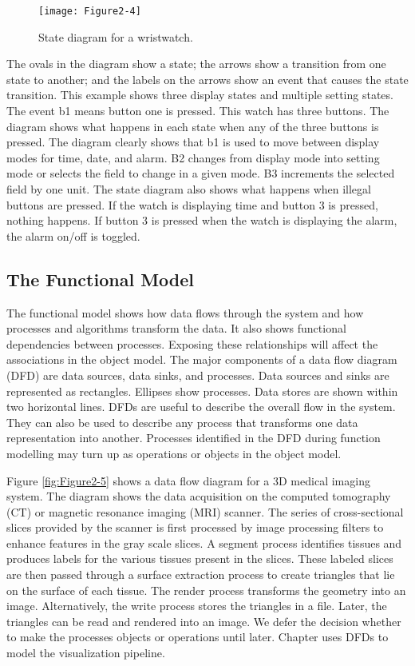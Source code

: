 \begin{figure}[!htb]
	\centering
	\texttt{[image: Figure2-4]}
	\caption{State diagram for a wristwatch.}
	\label{fig:Figure2-4}
\end{figure}

The ovals in the diagram show a state; the arrows show a transition from one state to another; and the labels on the arrows show an event that causes the state transition. This example shows three display states and multiple setting states. The event b1 means button one is pressed. This watch has three buttons. The diagram shows what happens in each state when any of the three buttons is pressed. The diagram clearly shows that b1 is used to move between display modes for time, date, and alarm. B2 changes from display mode into setting mode or selects the field to change in a given mode. B3 increments the selected field by one unit. The state diagram also shows what happens when illegal buttons are pressed. If the watch is displaying time and button 3 is pressed, nothing happens. If button 3 is pressed when the watch is displaying the alarm, the alarm on/off is toggled.

\subsection{The Functional Model}

The functional model shows how data flows through the system and how processes and algorithms transform the data. It also shows functional dependencies between processes. Exposing these relationships will affect the associations in the object model. The major components of a data flow diagram (DFD) are data sources, data sinks, and processes. Data sources and sinks are represented as rectangles. Ellipses show processes. Data stores are shown within two horizontal lines. DFDs are useful to describe the overall flow in the system. They can also be used to describe any process that transforms one data representation into another. Processes identified in the DFD during function modelling may turn up as operations or objects in the object model.

Figure \ref{fig:Figure2-5} shows a data flow diagram for a 3D medical imaging system. The diagram shows the data acquisition on the computed tomography (CT) or magnetic resonance imaging (MRI) scanner. The series of cross-sectional slices provided by the scanner is first processed by image processing filters to enhance features in the gray scale slices. A segment process identifies tissues and produces labels for the various tissues present in the slices. These labeled slices are then passed through a surface extraction process to create triangles that lie on the surface of each tissue. The render process transforms the geometry into an image. Alternatively, the write process stores the triangles in a file. Later, the triangles can be read and rendered into an image. We defer the decision whether to make the processes objects or operations until later. Chapter  uses DFDs to model the visualization pipeline.

